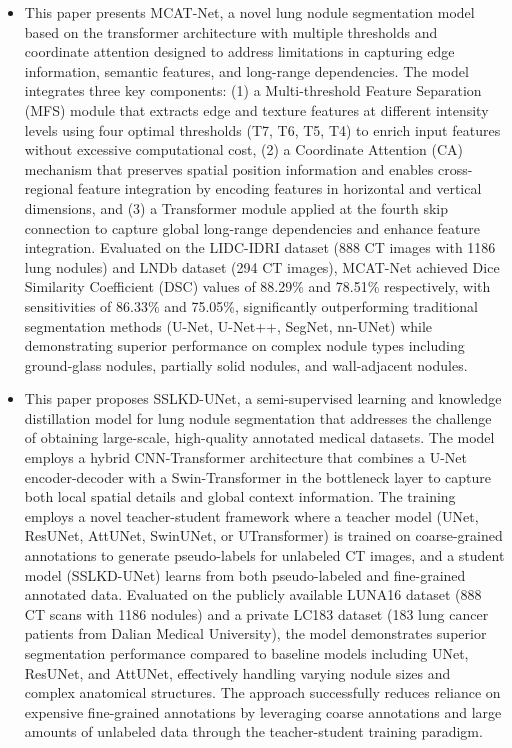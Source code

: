 \begin{itemize}
	\item This paper presents MCAT-Net, a novel lung nodule segmentation model based on the transformer architecture with multiple thresholds and coordinate attention designed to address limitations in capturing edge information, semantic features, and long-range dependencies. The model integrates three key components: (1) a Multi-threshold Feature Separation (MFS) module that extracts edge and texture features at different intensity levels using four optimal thresholds (T7, T6, T5, T4) to enrich input features without excessive computational cost, (2) a Coordinate Attention (CA) mechanism that preserves spatial position information and enables cross-regional feature integration by encoding features in horizontal and vertical dimensions, and (3) a Transformer module applied at the fourth skip connection to capture global long-range dependencies and enhance feature integration. Evaluated on the LIDC-IDRI dataset (888 CT images with 1186 lung nodules) and LNDb dataset (294 CT images), MCAT-Net achieved Dice Similarity Coefficient (DSC) values of 88.29\% and 78.51\% respectively, with sensitivities of 86.33\% and 75.05\%, significantly outperforming traditional segmentation methods (U-Net, U-Net++, SegNet, nn-UNet) while demonstrating superior performance on complex nodule types including ground-glass nodules, partially solid nodules, and wall-adjacent nodules. \cite{tian2024}
	\item This paper proposes SSLKD-UNet, a semi-supervised learning and knowledge distillation model for lung nodule segmentation that addresses the challenge of obtaining large-scale, high-quality annotated medical datasets. The model employs a hybrid CNN-Transformer architecture that combines a U-Net encoder-decoder with a Swin-Transformer in the bottleneck layer to capture both local spatial details and global context information. The training employs a novel teacher-student framework where a teacher model (UNet, ResUNet, AttUNet, SwinUNet, or UTransformer) is trained on coarse-grained annotations to generate pseudo-labels for unlabeled CT images, and a student model (SSLKD-UNet) learns from both pseudo-labeled and fine-grained annotated data. Evaluated on the publicly available LUNA16 dataset (888 CT scans with 1186 nodules) and a private LC183 dataset (183 lung cancer patients from Dalian Medical University), the model demonstrates superior segmentation performance compared to baseline models including UNet, ResUNet, and AttUNet, effectively handling varying nodule sizes and complex anatomical structures. The approach successfully reduces reliance on expensive fine-grained annotations by leveraging coarse annotations and large amounts of unlabeled data through the teacher-student training paradigm. \cite{wenjuan2025}

\end{itemize}
